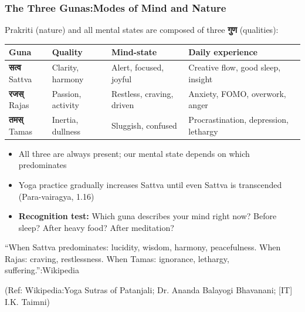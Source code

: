 \begin{frame}[fragile]\frametitle{The Three Gunas:Modes of Mind and Nature}

\begin{center}
{\normalsize Prakriti (nature) and all mental states are composed of three \textbf{गुण} (qualities):}
\end{center}

\begin{center}
{\small
\begin{tabular}{|p{1.5cm}|p{1.5cm}|p{1.5cm}|p{2.5cm}|}
\hline
\textbf{Guna} & \textbf{Quality} & \textbf{Mind-state} & \textbf{Daily experience} \\
\hline
\textbf{सत्व} Sattva & Clarity, harmony & Alert, focused, joyful & Creative flow, good sleep, insight \\
\textbf{रजस्} Rajas & Passion, activity & Restless, craving, driven & Anxiety, FOMO, overwork, anger \\
\textbf{तमस्} Tamas & Inertia, dullness & Sluggish, confused & Procrastination, depression, lethargy \\
\hline
\end{tabular}
}
\end{center}

\vspace{2mm}
\begin{itemize}
\item All three are always present; our mental state depends on which predominates
\item Yoga practice gradually increases Sattva until even Sattva is transcended (Para-vairagya, 1.16)
\item \textbf{Recognition test:} Which guna describes your mind right now? Before sleep? After heavy food? After meditation?
\end{itemize}

\begin{center}
{\small ``When Sattva predominates: lucidity, wisdom, harmony, peacefulness. When Rajas: craving, restlessness. When Tamas: ignorance, lethargy, suffering.'':Wikipedia}
\end{center}

\tiny{(Ref: Wikipedia:Yoga Sutras of Patanjali; Dr. Ananda Balayogi Bhavanani; [IT] I.K. Taimni)}

\end{frame}


